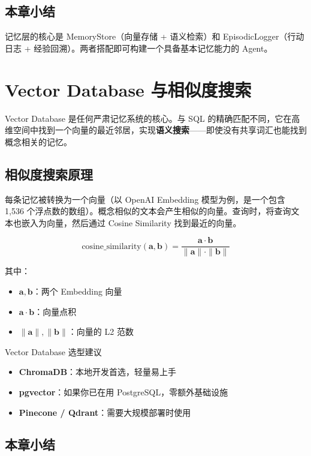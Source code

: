 \documentclass[a4paper]{article}
\begin{document}
\subsection{本章小结}

记忆层的核心是 MemoryStore（向量存储 + 语义检索）和 EpisodicLogger（行动日志 + 经验回溯）。两者搭配即可构建一个具备基本记忆能力的 Agent。

\section{Vector Database 与相似度搜索}

Vector Database 是任何严肃记忆系统的核心。与 SQL 的精确匹配不同，它在高维空间中找到一个向量的最近邻居，实现\textbf{语义搜索}——即使没有共享词汇也能找到概念相关的记忆。

\subsection{相似度搜索原理}

每条记忆被转换为一个向量（以 OpenAI Embedding 模型为例，是一个包含 1,536 个浮点数的数组）。概念相似的文本会产生相似的向量。查询时，将查询文本也嵌入为向量，然后通过 Cosine Similarity 找到最近的向量。

$$
\text{cosine\_similarity}(\mathbf{a}, \mathbf{b}) = \frac{\mathbf{a} \cdot \mathbf{b}}{\|\mathbf{a}\| \cdot \|\mathbf{b}\|}
$$

其中：
\begin{itemize}[leftmargin=2em]
    \item $\mathbf{a}, \mathbf{b}$：两个 Embedding 向量
    \item $\mathbf{a} \cdot \mathbf{b}$：向量点积
    \item $\|\mathbf{a}\|, \|\mathbf{b}\|$：向量的 L2 范数
\end{itemize}

\begin{knowledgebox}{Vector Database 选型建议}
\begin{itemize}[leftmargin=1.5em]
    \item \textbf{ChromaDB}：本地开发首选，轻量易上手
    \item \textbf{pgvector}：如果你已在用 PostgreSQL，零额外基础设施
    \item \textbf{Pinecone / Qdrant}：需要大规模部署时使用
\end{itemize}
\end{knowledgebox}

\subsection{本章小结}
\end{document}
